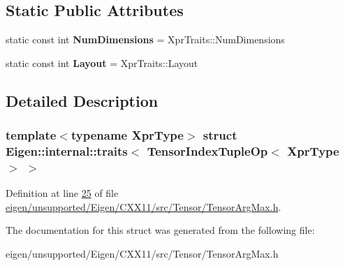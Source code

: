 \subsection*{Static Public Attributes}
\begin{DoxyCompactItemize}
\item 
\mbox{\label{struct_eigen_1_1internal_1_1traits_3_01_tensor_index_tuple_op_3_01_xpr_type_01_4_01_4_abc54db25815f5189f614db0e53e0e23f}} 
static const int {\bfseries Num\+Dimensions} = Xpr\+Traits\+::\+Num\+Dimensions
\item 
\mbox{\label{struct_eigen_1_1internal_1_1traits_3_01_tensor_index_tuple_op_3_01_xpr_type_01_4_01_4_afe9bd9a2256ddc467c2d0cdb21e8f5dc}} 
static const int {\bfseries Layout} = Xpr\+Traits\+::\+Layout
\end{DoxyCompactItemize}


\subsection{Detailed Description}
\subsubsection*{template$<$typename Xpr\+Type$>$\newline
struct Eigen\+::internal\+::traits$<$ Tensor\+Index\+Tuple\+Op$<$ Xpr\+Type $>$ $>$}



Definition at line \hyperlink{eigen_2unsupported_2_eigen_2_c_x_x11_2src_2_tensor_2_tensor_arg_max_8h_source_l00025}{25} of file \hyperlink{eigen_2unsupported_2_eigen_2_c_x_x11_2src_2_tensor_2_tensor_arg_max_8h_source}{eigen/unsupported/\+Eigen/\+C\+X\+X11/src/\+Tensor/\+Tensor\+Arg\+Max.\+h}.



The documentation for this struct was generated from the following file\+:\begin{DoxyCompactItemize}
\item 
eigen/unsupported/\+Eigen/\+C\+X\+X11/src/\+Tensor/\+Tensor\+Arg\+Max.\+h\end{DoxyCompactItemize}
